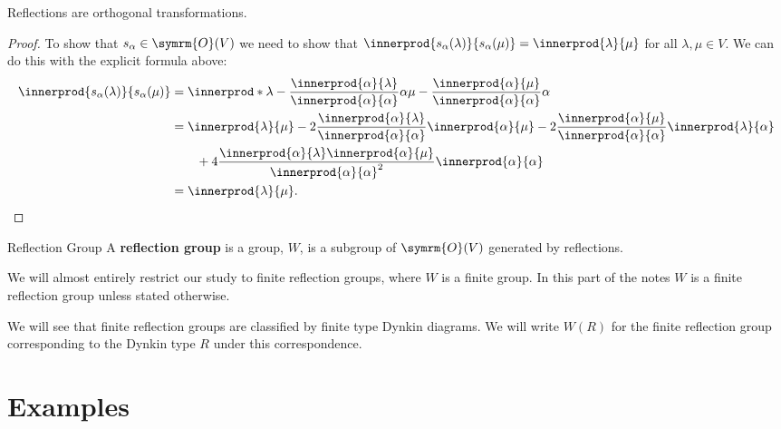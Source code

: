 \documentclass[fleqn, a4paper, openany]{memoir}
\newcommand{\define}[1]{\textbf{#1}}
\newcommand{\orthogonal}{\symrm{O}}
\begin{document}
    \begin{lma}{}{}
        Reflections are orthogonal transformations.
        \begin{proof}
            To show that \(s_\alpha \in \orthogonal(V)\) we need to show that \(\innerprod{s_\alpha(\lambda)}{s_\alpha(\mu)} = \innerprod{\lambda}{\mu}\) for all \(\lambda, \mu \in V\).
            We can do this with the explicit formula above:
            \begin{align}
                \innerprod{s_\alpha(\lambda)}{s_\alpha(\mu)} &= \innerprod*{\lambda - \frac{\innerprod{\alpha}{\lambda}}{\innerprod{\alpha}{\alpha}}\alpha}{\mu - \frac{\innerprod{\alpha}{\mu}}{\innerprod{\alpha}{\alpha}}\alpha}\\
                &= \innerprod{\lambda}{\mu} - 2\frac{\innerprod{\alpha}{\lambda}}{\innerprod{\alpha}{\alpha}}\innerprod{\alpha}{\mu} - 2\frac{\innerprod{\alpha}{\mu}}{\innerprod{\alpha}{\alpha}}\innerprod{\lambda}{\alpha} \\
                &\qquad+ 4\frac{\innerprod{\alpha}{\lambda} \innerprod{\alpha}{\mu}}{\innerprod{\alpha}{\alpha}^2} \innerprod{\alpha}{\alpha} \notag\\
                &= \innerprod{\lambda}{\mu}. \notag\qedhere
            \end{align}
        \end{proof}
    \end{lma}
    
    \begin{dfn}{Reflection Group}{}
        A \define{reflection group} is a group, \(W\), is a subgroup of \(\orthogonal(V)\) generated by reflections.
    \end{dfn}
    
    We will almost entirely restrict our study to finite reflection groups, where \(W\) is a finite group.
    In this part of the notes \(W\) is a finite reflection group unless stated otherwise.
    
    We will see that finite reflection groups are classified by finite type Dynkin diagrams.
    We will write \(W(R)\) for the finite reflection group corresponding to the Dynkin type \(R\) under this correspondence.
    
    \section{Examples}
\end{document}
